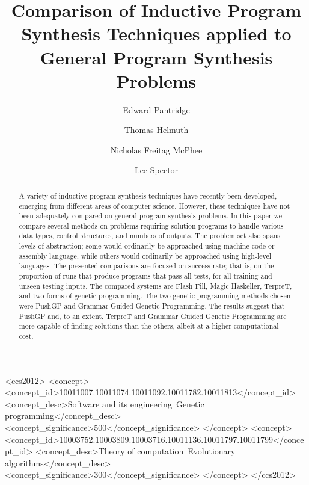 \documentclass[sigconf]{acmart}
\begin{document}
\title{Comparison of Inductive Program Synthesis Techniques applied to General Program Synthesis Problems}

\author{Edward Pantridge}

\author{Thomas Helmuth}

\author{Nicholas Freitag McPhee}

\author{Lee Spector}


\begin{abstract}
A variety of inductive program synthesis techniques have recently been developed, emerging from different areas of computer science. However, these techniques have not been adequately compared on general program synthesis problems. In this paper we compare several methods on problems requiring solution programs to handle various data types, control structures, and numbers of outputs. The problem set also spans levels of abstraction; some would ordinarily be approached using machine code or assembly language, while others would ordinarily be approached using high-level languages. The presented comparisons are focused on success rate; that is, on the proportion of runs that produce programs that pass all tests, for all training and unseen testing inputs. The compared systems are Flash Fill, Magic Haskeller, TerpreT, and two forms of genetic programming. The two genetic programming methods chosen were PushGP and Grammar Guided Genetic Programming. The results suggest that PushGP and, to an extent, TerpreT and Grammar Guided Genetic Programming are more capable of finding solutions than the others, albeit at a higher computational cost.
\end{abstract}

%
%
\begin{CCSXML}
<ccs2012>
<concept>
<concept_id>10011007.10011074.10011092.10011782.10011813</concept_id>
<concept_desc>Software and its engineering~Genetic programming</concept_desc>
<concept_significance>500</concept_significance>
</concept>
<concept>
<concept_id>10003752.10003809.10003716.10011136.10011797.10011799</concept_id>
<concept_desc>Theory of computation~Evolutionary algorithms</concept_desc>
<concept_significance>300</concept_significance>
</concept>
</ccs2012>
\end{CCSXML}
\end{document}
